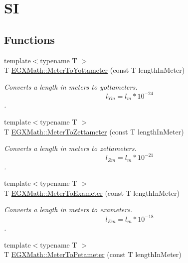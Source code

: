 \hypertarget{group___e_g_x_math-_conversions-_length_conversions-_meter-_s_i}{}\section{SI}
\label{group___e_g_x_math-_conversions-_length_conversions-_meter-_s_i}
\subsection*{Functions}
\begin{DoxyCompactItemize}
\item 
{\footnotesize template$<$typename T $>$ }\\T \mbox{\hyperlink{group___e_g_x_math-_conversions-_length_conversions-_meter-_s_i_ga53fdb093b4572363a0ae9be4ced2ecb4}{E\+G\+X\+Math\+::\+Meter\+To\+Yottameter}} (const T length\+In\+Meter)
\begin{DoxyCompactList}\small\item\em Converts a length in meters to yottameters. \[ l_{Ym}=l_{m} * 10^{-24} \]. \end{DoxyCompactList}\item 
{\footnotesize template$<$typename T $>$ }\\T \mbox{\hyperlink{group___e_g_x_math-_conversions-_length_conversions-_meter-_s_i_gafbd51e362ddfd28f270450693783f5c6}{E\+G\+X\+Math\+::\+Meter\+To\+Zettameter}} (const T length\+In\+Meter)
\begin{DoxyCompactList}\small\item\em Converts a length in meters to zettameters. \[ l_{Zm}=l_{m} * 10^{-21} \]. \end{DoxyCompactList}\item 
{\footnotesize template$<$typename T $>$ }\\T \mbox{\hyperlink{group___e_g_x_math-_conversions-_length_conversions-_meter-_s_i_gadee48ed1b24c416ef0289dc4d803504b}{E\+G\+X\+Math\+::\+Meter\+To\+Exameter}} (const T length\+In\+Meter)
\begin{DoxyCompactList}\small\item\em Converts a length in meters to exameters. \[ l_{Em}=l_{m} * 10^{-18} \]. \end{DoxyCompactList}\item 
{\footnotesize template$<$typename T $>$ }\\T \mbox{\hyperlink{group___e_g_x_math-_conversions-_length_conversions-_meter-_s_i_gaf808f7191ee069df013a26281f227388}{E\+G\+X\+Math\+::\+Meter\+To\+Petameter}} (const T length\+In\+Meter)

\end{DoxyCompactItemize}
